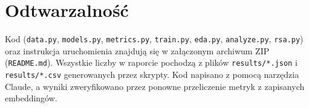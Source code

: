 \documentclass[11pt,a4paper]{article}
\begin{document}
\section*{Odtwarzalność}
Kod (\texttt{data.py}, \texttt{models.py}, \texttt{metrics.py}, \texttt{train.py}, \texttt{eda.py}, \texttt{analyze.py}, \texttt{rsa.py})
oraz instrukcja uruchomienia znajdują się w załączonym archiwum ZIP (\texttt{README.md}). Wszystkie liczby w raporcie
pochodzą z plików \texttt{results/*.json} i \texttt{results/*.csv} generowanych przez skrypty.
Kod napisano z pomocą narzędzia Claude, a wyniki zweryfikowano przez ponowne przeliczenie metryk z zapisanych embeddingów.
\end{document}
